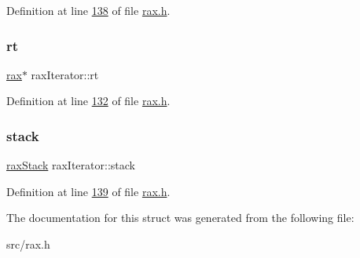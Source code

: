 Definition at line \hyperlink{rax_8h_source_l00138}{138} of file \hyperlink{rax_8h_source}{rax.\+h}.

\mbox{\label{structraxIterator_af13f0f675767e94b420819f664e52043}} 
\subsubsection{\texorpdfstring{rt}{rt}}
{\footnotesize\ttfamily \hyperlink{structrax}{rax}$\ast$ rax\+Iterator\+::rt}



Definition at line \hyperlink{rax_8h_source_l00132}{132} of file \hyperlink{rax_8h_source}{rax.\+h}.

\mbox{\label{structraxIterator_a73ab5e237079aaa64fae170592a5a3fd}} 
\subsubsection{\texorpdfstring{stack}{stack}}
{\footnotesize\ttfamily \hyperlink{structraxStack}{rax\+Stack} rax\+Iterator\+::stack}



Definition at line \hyperlink{rax_8h_source_l00139}{139} of file \hyperlink{rax_8h_source}{rax.\+h}.



The documentation for this struct was generated from the following file\+:\begin{DoxyCompactItemize}
\item 
src/rax.\+h\end{DoxyCompactItemize}
